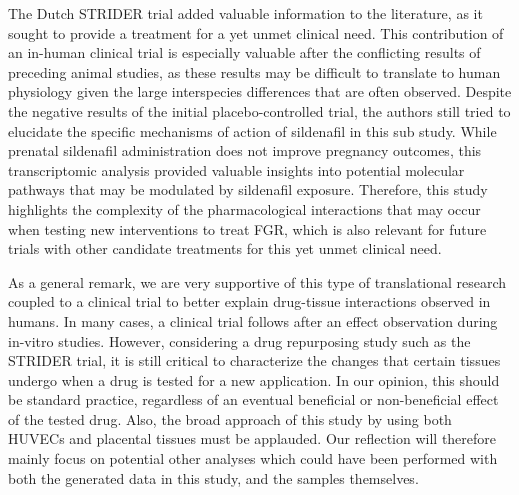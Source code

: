 \documentclass[authordate, reflection,issue]{jote-new-article}
\begin{document}
	The Dutch STRIDER trial added valuable information to the literature, as it sought to provide a treatment for a yet unmet clinical need. This contribution of an in-human clinical trial is especially valuable after the conflicting results of preceding animal studies, as these results may be difficult to translate to human physiology given the large interspecies differences that are often observed. Despite the negative results of the initial placebo-controlled trial, the authors still tried to elucidate the specific mechanisms of action of sildenafil in this sub study. While prenatal sildenafil administration does not improve pregnancy outcomes, this transcriptomic analysis provided valuable insights into potential molecular pathways that may be modulated by sildenafil exposure. Therefore, this study highlights the complexity of the pharmacological interactions that may occur when testing new interventions to treat FGR, which is also relevant for future trials with other candidate treatments for this yet unmet clinical need.



	As a general remark, we are very supportive of this type of translational research coupled to a clinical trial to better explain drug-tissue interactions observed in humans. In many cases, a clinical trial follows after an effect observation during in-vitro studies. However, considering a drug repurposing study such as the STRIDER trial, it is still critical to characterize the changes that certain tissues undergo when a drug is tested for a new application. In our opinion, this should be standard practice, regardless of an eventual beneficial or non-beneficial effect of the tested drug. Also, the broad approach of this study by using both HUVECs and placental tissues must be applauded. Our reflection will therefore mainly focus on potential other analyses which could have been performed with both the generated data in this study, and the samples themselves.
\end{document}
